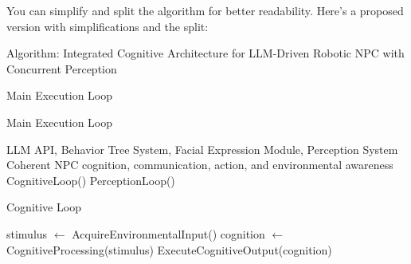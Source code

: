 \documentclass[pdflatex,sn-mathphys-num]{sn-jnl}%
\theoremstyle{thmstyleone}%
\theoremstyle{thmstyletwo}%
\theoremstyle{thmstylethree}%
\begin{document}

You can simplify and split the algorithm for better readability. Here’s a proposed version with simplifications and the split:

Algorithm: Integrated Cognitive Architecture for LLM-Driven Robotic NPC with Concurrent Perception

Main Execution Loop
\begin{algorithm}
\caption{Main Execution Loop}\label{algo_main_execution_loop}
\begin{algorithmic}[1]
\Require LLM API, Behavior Tree System, Facial Expression Module, Perception System
\Ensure Coherent NPC cognition, communication, action, and environmental awareness
    \Parallel
        \State CognitiveLoop()
        \State PerceptionLoop()
    \EndParallel
\EndProcedure
\end{algorithmic}
\end{algorithm}


\begin{algorithm}
\caption{Cognitive Loop}\label{algo_cognitive_loop}
\begin{algorithmic}[1]
        \State stimulus $\gets$ AcquireEnvironmentalInput()
        \State cognition $\gets$ CognitiveProcessing(stimulus)
        \State ExecuteCognitiveOutput(cognition)
    \EndWhile
\EndProcedure
\end{algorithmic}
\end{algorithm}
\end{document}
